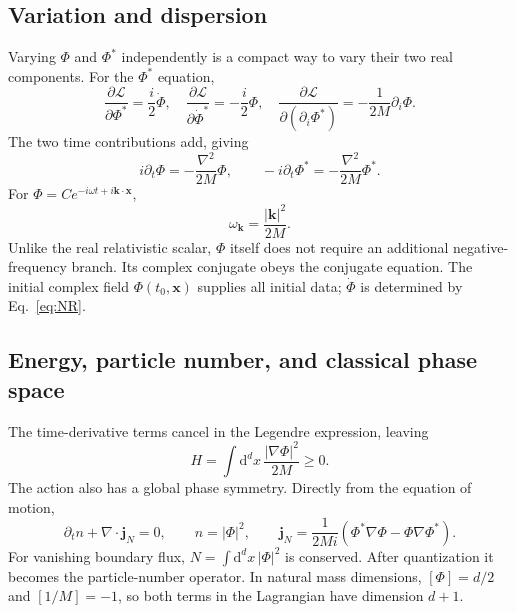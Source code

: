 \documentclass[11pt]{article}
\newcommand{\dd}{\mathrm{d}}
\newcommand{\Lag}{\mathcal{L}}
\begin{document}
\subsection{Variation and dispersion}

Varying \(\Phi\) and \(\Phi^*\) independently is a compact way to vary their
two real components. For the \(\Phi^*\) equation,
\begin{equation}
\frac{\partial\Lag}{\partial\Phi^*}=\frac{i}{2}\dot\Phi,
\quad
\frac{\partial\Lag}{\partial\dot\Phi^*}=-\frac{i}{2}\Phi,
\quad
\frac{\partial\Lag}{\partial(\partial_i\Phi^*)}
=-\frac{1}{2M}\partial_i\Phi.
\end{equation}
The two time contributions add, giving
\begin{equation}
\boxed{i\partial_t\Phi=-\frac{\nabla^2}{2M}\Phi,}
\qquad
-i\partial_t\Phi^*=-\frac{\nabla^2}{2M}\Phi^*.
\label{eq:NR}
\end{equation}
For \(\Phi=C e^{-i\omega t+i\bm k\cdot\bm x}\),
\begin{equation}
\boxed{\omega_{\bm k}=\frac{|\bm k|^2}{2M}.}
\label{eq:NRdispersion}
\end{equation}
Unlike the real relativistic scalar, \(\Phi\) itself does not require an
additional negative-frequency branch. Its complex conjugate obeys the
conjugate equation. The initial complex field \(\Phi(t_0,\bm x)\) supplies
all initial data; \(\dot\Phi\) is determined by Eq.~\eqref{eq:NR}.

\subsection{Energy, particle number, and classical phase space}

The time-derivative terms cancel in the Legendre expression, leaving
\begin{equation}
H=\int\dd^d x\,\frac{|\nabla\Phi|^2}{2M}\geq0.
\end{equation}
The action also has a global phase symmetry. Directly from the equation of
motion,
\begin{equation}
\partial_t n+\nabla\cdot\bm j_N=0,
\qquad n=|\Phi|^2,
\qquad
\bm j_N=\frac{1}{2Mi}(\Phi^*\nabla\Phi-\Phi\nabla\Phi^*).
\label{eq:NRcurrent}
\end{equation}
For vanishing boundary flux, \(N=\int\dd^d x\,|\Phi|^2\) is conserved.
After quantization it becomes the particle-number operator. In natural mass
dimensions, \([\Phi]=d/2\) and \([1/M]=-1\), so both terms in the
Lagrangian have dimension \(d+1\).
\end{document}
